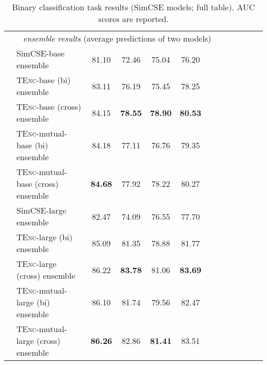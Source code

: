 \documentclass{article} \usepackage{iclr2021_conference,times}
\newcommand{\tenc}{\textsc{TEnc}\xspace}
\begin{document}
\begin{table}[!t]
\begin{tabular}{llccccccccccc}
\multicolumn{9}{c}{\textit{ensemble results} (average predictions of two models)} \\
  \cmidrule[1.0pt]{1-10}
& SimCSE-base ensemble & 81.10 & 72.46 & 75.04 & 76.20 \\
&\tenc-base (bi) ensemble & 83.11 & 76.19 & 75.45 & 78.25 \\
 & \tenc-base (cross) ensemble & 84.15 & \textbf{78.55} & \textbf{78.90} & \textbf{80.53} \\
\rowcolor{blue!5}
& \tenc-mutual-base (bi) ensemble & 84.18 & 77.11 & 76.76 & 79.35  \\
\rowcolor{blue!5}
 & \tenc-mutual-base (cross) ensemble & \textbf{84.68} & 77.92 & 78.22 & 80.27 \\
\cmidrule[.5pt]{1-10}
 & SimCSE-large ensemble & 82.47 & 74.09 & 76.55 & 77.70 \\
  & \tenc-large (bi) ensemble & 85.09 & 81.35 & 78.88 & 81.77 \\
  & \tenc-large (cross) ensemble & 86.22 & \textbf{83.78} & 81.06 & \textbf{83.69} \\
\rowcolor{red!5}
 & \tenc-mutual-large (bi) ensemble & 86.10 & 81.74 & 79.56 & 82.47 \\
\rowcolor{red!5}
 & \tenc-mutual-large (cross) ensemble & \textbf{86.26} & 82.86 & \textbf{81.41} & 83.51 \\
\cmidrule[1.5pt]{1-10}
\end{tabular}
\caption{Binary classification task results (SimCSE models; full table). AUC scores are reported.}
\label{tab:binary_full}
\end{table}
\end{document}
